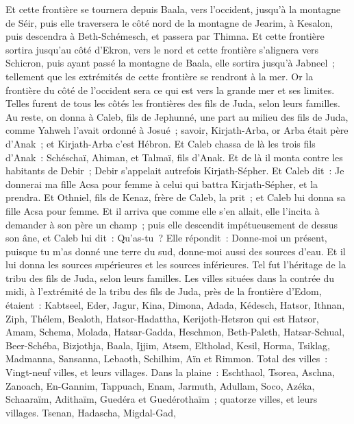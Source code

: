 \begin{multicols}{2}
Et cette frontière se tournera depuis Baala, vers l'occident, jusqu'à la montagne de Séir, puis elle traversera le côté nord de la montagne de Jearim, à Kesalon, puis descendra à Beth-Schémesch, et passera par Thimna.
Et cette frontière sortira jusqu'au côté d'Ekron, vers le nord et cette frontière s'alignera vers Schicron, puis ayant passé la montagne de Baala, elle sortira jusqu'à Jabneel~; tellement que les extrémités de cette frontière se rendront à la mer. 
Or la frontière du côté de l'occident sera ce qui est vers la grande mer et ses limites. Telles furent de tous les côtés les frontières des fils de Juda, selon leurs familles.
Au reste, on donna à Caleb, fils de Jephunné, une part au milieu des fils de Juda, comme Yahweh l'avait ordonné à Josué~; savoir, Kirjath-Arba, or Arba était père d'Anak~; et Kirjath-Arba c'est Hébron.
Et Caleb chassa de là les trois fils d'Anak~: Schéschaï, Ahiman, et Talmaï, fils d'Anak.
Et de là il monta contre les habitants de Debir~; Debir s'appelait autrefois Kirjath-Sépher.
Et Caleb dit~: Je donnerai ma fille Acsa pour femme à celui qui battra Kirjath-Sépher, et la prendra.
Et Othniel, fils de Kenaz, frère de Caleb, la prit~; et Caleb lui donna sa fille Acsa pour femme.
Et il arriva que comme elle s'en allait, elle l'incita à demander à son père un champ~; puis elle descendit impétueusement de dessus son âne, et Caleb lui dit~: Qu'as-tu~? 
Elle répondit~: Donne-moi un présent, puisque tu m'as donné une terre du sud, donne-moi aussi des sources d'eau. Et il lui donna les sources supérieures et les sources inférieures.
Tel fut l'héritage de la tribu des fils de Juda, selon leurs familles.
Les villes situées dans la contrée du midi, à l'extrémité de la tribu des fils de Juda, près de la frontière d'Edom, étaient~: Kabtseel, Eder, Jagur,
Kina, Dimona, Adada,
Kédesch, Hatsor, Ithnan,
Ziph, Thélem, Bealoth,
Hatsor-Hadattha, Kerijoth-Hetsron qui est Hatsor,
Amam, Schema, Molada,
Hatsar-Gadda, Heschmon, Beth-Paleth,
Hatsar-Schual, Beer-Schéba, Bizjothja,
Baala, Ijjim, Atsem,
Eltholad, Kesil, Horma,
Tsiklag, Madmanna, Sansanna,
Lebaoth, Schilhim, Aïn et Rimmon. Total des villes~: Vingt-neuf villes, et leurs villages.
Dans la plaine~: Eschthaol, Tsorea, Aschna,
Zanoach, En-Gannim, Tappuach, Enam,
Jarmuth, Adullam, Soco, Azéka,
Schaaraïm, Adithaïm, Guedéra et Guedérothaïm~; quatorze villes, et leurs villages.
Tsenan, Hadascha, Migdal-Gad,

\end{multicols}
